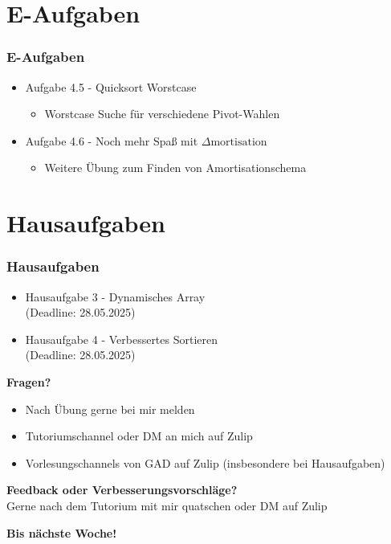 \documentclass{beamer}
\begin{document}
\section{E-Aufgaben}
\begin{frame}
	\frametitle{E-Aufgaben}
	\begin{itemize}
		\item Aufgabe 4.5 - Quicksort Worstcase \\
		      \begin{itemize}
			      \item Worstcase Suche für verschiedene Pivot-Wahlen
		      \end{itemize}
		\item Aufgabe 4.6 - Noch mehr Spaß mit $\Delta\text{mortisation}$
		      \begin{itemize}
			      \item Weitere Übung zum Finden von Amortisationschema
		      \end{itemize}
	\end{itemize}
\end{frame}

\section{Hausaufgaben}
\begin{frame}
	\frametitle{Hausaufgaben}
	\begin{itemize}
		\item Hausaufgabe 3 - Dynamisches Array \\
		      (Deadline: 28.05.2025)
		\item Hausaufgabe 4 - Verbessertes Sortieren \\
		      (Deadline: 28.05.2025)
	\end{itemize}
\end{frame}

\begin{frame}
	\textbf{Fragen?}
	\begin{itemize}
		\item Nach Übung gerne bei mir melden
		\item Tutoriumschannel oder DM an mich auf Zulip
		\item Vorlesungschannels von GAD auf Zulip (insbesondere bei Hausaufgaben)
	\end{itemize}

	\medskip
	\textbf{Feedback oder Verbesserungsvorschläge?} \\
	Gerne nach dem Tutorium mit mir quatschen oder DM auf Zulip

	\medskip
	\textbf{Bis nächste Woche!}
\end{frame}

\end{document}
